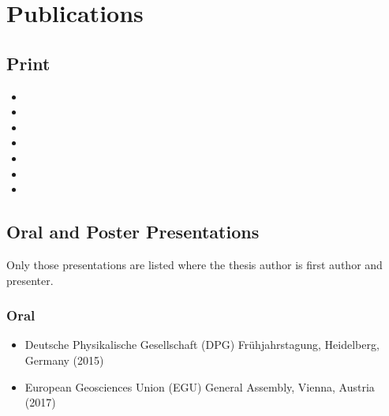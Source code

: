 \chapter*{Publications}\label{app:publications}

\begin{refsection}

    \section*{Print}
    \begin{itemize}
        \item {}
        \item {}
        \item {}
        \item {}
        \item {}
        \item {}
        \item {}
    \end{itemize}

    \section*{Oral and Poster Presentations}
    Only those presentations are listed where the thesis author is first  author and presenter.
    \subsection*{Oral}
    \begin{itemize}
        \item Deutsche Physikalische Gesellschaft (DPG) Frühjahrstagung, Heidelberg, Germany (2015)
        \item European Geosciences Union (EGU) General Assembly, Vienna, Austria (2017)
    \end{itemize}

\end{refsection}
